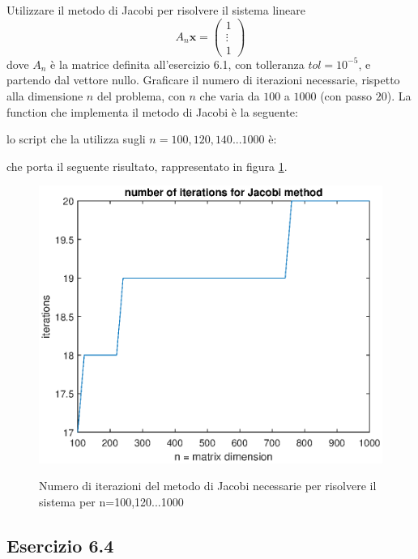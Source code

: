 Utilizzare il metodo di Jacobi per risolvere il sistema lineare
\begin{equation*}
	A_n \mathbf{x} = \begin{pmatrix} 1 \\ \vdots \\ 1 \end{pmatrix}
\end{equation*}
dove $A_n$ è la matrice definita all'esercizio 6.1, con tolleranza $tol = 10^{-5}$, e partendo dal vettore nullo. Graficare il numero di iterazioni necessarie, rispetto alla dimensione $n$ del problema, con $n$ che varia da $100$ a $1000$ (con passo $20$).
\PP
La function che implementa il metodo di Jacobi è la seguente:

lo script che la utilizza sugli $n = 100, 120, 140 ... 1000$ è:

che porta il seguente risultato, rappresentato in figura \ref{fig:6_3_jacobi}.\\
\begin{figure}[h!]
    \centering
    \includegraphics[scale=0.6]{./capitolo_6/exercise_6_3}
    \label{fig:6_3_jacobi}
    \caption{Numero di iterazioni del metodo di Jacobi necessarie per risolvere il sistema per n=100,120...1000}
\end{figure}



	\subsection{Esercizio 6.4}
	
